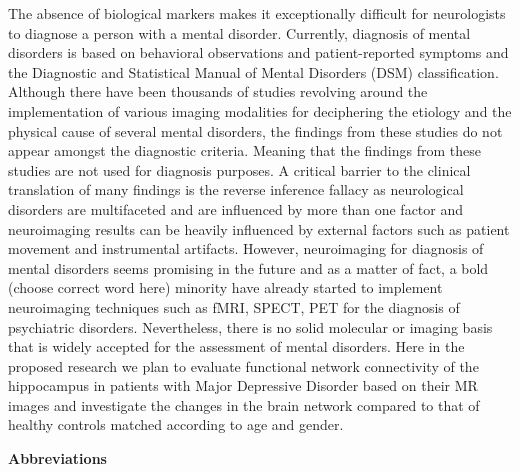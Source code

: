 \documentclass{article}
\begin{document}
The absence of biological markers makes it exceptionally difficult for
neurologists to diagnose a person with a mental disorder. Currently,
diagnosis of mental disorders is based on behavioral observations and
patient-reported symptoms and the Diagnostic and Statistical Manual of
Mental Disorders (DSM) classification. Although there have been
thousands of studies revolving around the implementation of various
imaging modalities for deciphering the etiology and the physical cause
of several mental disorders, the findings from these studies do not
appear amongst the diagnostic criteria. Meaning that the findings from
these studies are not used for diagnosis purposes. A critical barrier
to the clinical translation of many findings is the reverse inference
fallacy as neurological disorders are multifaceted and are influenced
by more than one factor and neuroimaging results can be heavily
influenced by external factors such as patient movement and
instrumental artifacts. However, neuroimaging for diagnosis of mental
disorders seems promising in the future and as a matter of fact, a
bold (choose correct word here) minority have already started to
implement neuroimaging techniques such as fMRI, SPECT, PET for the
diagnosis of psychiatric disorders. Nevertheless, there is no solid
molecular or imaging basis that is widely accepted for the assessment
of mental disorders. Here in the proposed research we plan to evaluate
functional network connectivity of the hippocampus in patients with
Major Depressive Disorder based on their MR images and investigate the
changes in the brain network compared to that of healthy controls
matched according to age and gender.

\newpage

\begin{center}
  \textbf{\large Abbreviations}
\end{center}
\end{document}
